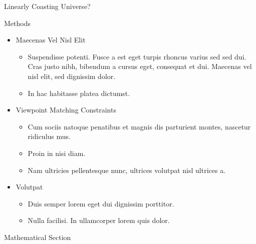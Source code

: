\documentclass[final,hyperref={pdfpagelabels=false}]{beamer}
\begin{document}
\begin{frame}[t]
\begin{columns}[t]
\begin{column}{.465\textwidth}
\begin{block}{Linearly Coasting Universe?}
\end{block}


\begin{block}{Methods}

\begin{itemize}
\item Maecenas Vel Nisl Elit
\begin{itemize}
\item Suspendisse potenti. Fusce a est eget turpis rhoncus varius sed sed dui. Cras justo nibh, bibendum a cursus eget, consequat et dui. Maecenas vel nisl elit, sed dignissim dolor. 
\item In hac habitasse platea dictumst.
\end{itemize}

\item Viewpoint Matching Constraints
\begin{itemize}
\item Cum sociis natoque penatibus et magnis dis parturient montes, nascetur ridiculus mus. 
\item Proin in nisi diam.
\item Nam ultricies pellentesque nunc, ultrices volutpat nisl ultrices a.
\end{itemize}

\item Volutpat 
\begin{itemize}
\item Duis semper lorem eget dui dignissim porttitor.
\item Nulla facilisi. In ullamcorper lorem quis dolor.
\end{itemize}
\end{itemize}

\end{block}


\begin{block}{Mathematical Section}


\end{block}
\end{column}
\end{columns}
\end{frame}
\end{document}
